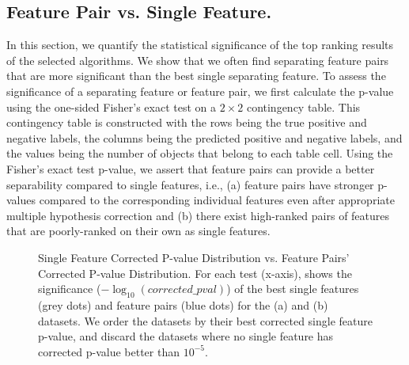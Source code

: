 \subsection{Feature Pair vs. Single Feature.}\label{sec:FPvSF}

In this section, we quantify the statistical significance of the top ranking results of the selected algorithms. We show that we often find separating feature pairs that are more significant than the best single separating feature. To assess the significance of a separating feature or feature pair, we first calculate the p-value using the one-sided Fisher's exact test on a $2\times2$ contingency table. This contingency table is constructed with the rows being the true positive and negative labels, the columns being the predicted positive and negative labels, and the values being the number of objects that belong to each table cell. Using the Fisher's exact test p-value, we assert that feature pairs can provide a better separability compared to single features, i.e., (a) feature pairs have stronger p-values compared to the corresponding individual features even after appropriate multiple hypothesis correction and (b) there exist high-ranked pairs of features that are poorly-ranked on their own as single features.

\begin{figure}[h]
\centering %
\vspace{-5mm}
\vspace{-5mm}
\caption{Single Feature Corrected P-value Distribution vs. Feature Pairs' Corrected P-value Distribution. For each test (x-axis), shows the significance ($-\log_{10} (corrected\_pval)$) of the \tophundred best single features (grey dots) and feature pairs (blue dots) for the (a) \msig and (b) \lincs datasets. We order the datasets by their best corrected single feature p-value, and discard the datasets where no single feature has corrected p-value better than $10^{-5}$.}
\vspace{-5mm}
\label{fig:SF_FP}
\end{figure}

